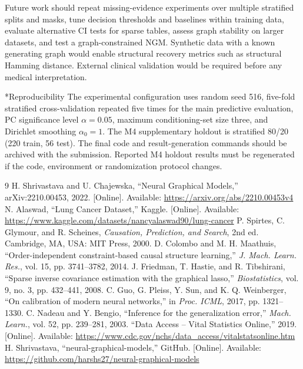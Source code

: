 \documentclass[10pt,twocolumn,letterpaper]{article}
\makeatletter
\renewcommand\section{\@startsection{section}{1}{\z@}{1.5ex plus 0.5ex minus 0.2ex}{1ex plus 0.2ex}{\centering\normalfont\footnotesize\scshape}}
\makeatother
\begin{document}
Future work should repeat missing-evidence experiments over multiple stratified splits and masks, tune decision thresholds and baselines within training data, evaluate alternative CI tests for sparse tables, assess graph stability on larger datasets, and test a graph-constrained NGM. Synthetic data with a known generating graph would enable structural recovery metrics such as structural Hamming distance. External clinical validation would be required before any medical interpretation.

\section*{Reproducibility}
\noindent The experimental configuration uses random seed 516, five-fold stratified cross-validation repeated five times for the main predictive evaluation, PC significance level $\alpha=0.05$, maximum conditioning-set size three, and Dirichlet smoothing $\alpha_0=1$. The M4 supplementary holdout is stratified 80/20 (220 train, 56 test). The final code and result-generation commands should be archived with the submission. Reported M4 holdout results must be regenerated if the code, environment or randomization protocol changes.

\label{refs}
\begin{thebibliography}{9}\small
{} H. Shrivastava and U. Chajewska, ``Neural Graphical Models,'' arXiv:2210.00453, 2022. [Online]. Available: \url{https://arxiv.org/abs/2210.00453v4}
 N. Alaswad, ``Lung Cancer Dataset,'' Kaggle. [Online]. Available: \url{https://www.kaggle.com/datasets/nancyalaswad90/lung-cancer}
 P. Spirtes, C. Glymour, and R. Scheines, \emph{Causation, Prediction, and Search}, 2nd ed. Cambridge, MA, USA: MIT Press, 2000.
 D. Colombo and M. H. Maathuis, ``Order-independent constraint-based causal structure learning,'' \emph{J. Mach. Learn. Res.}, vol. 15, pp. 3741--3782, 2014.
 J. Friedman, T. Hastie, and R. Tibshirani, ``Sparse inverse covariance estimation with the graphical lasso,'' \emph{Biostatistics}, vol. 9, no. 3, pp. 432--441, 2008.
 C. Guo, G. Pleiss, Y. Sun, and K. Q. Weinberger, ``On calibration of modern neural networks,'' in \emph{Proc. ICML}, 2017, pp. 1321--1330.
 C. Nadeau and Y. Bengio, ``Inference for the generalization error,'' \emph{Mach. Learn.}, vol. 52, pp. 239--281, 2003.
 ``Data Access -- Vital Statistics Online,'' 2019. [Online]. Available: \url{https://www.cdc.gov/nchs/data_access/vitalstatsonline.htm}
 H. Shrivastava, ``neural-graphical-models,'' GitHub. [Online]. Available: \url{https://github.com/harshs27/neural-graphical-models}
\end{thebibliography}
\end{document}
